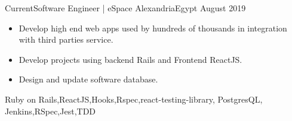 \begin{experiences}
  \experience
    {Current}{Software Engineer | eSpace }{Alexandria}{Egypt}
    {August 2019}   {
                      \begin{itemize}
                        \item Develop high end web apps used by hundreds of thousands in integration with third parties service.
                        \item Develop projects using backend Rails and Frontend ReactJS.
                        \item Design and update software database.
                      \end{itemize}
                    }
                    {Ruby on Rails,ReactJS,Hooks,Rspec,react-testing-library, PostgresQL, Jenkins,RSpec,Jest,TDD}                    
\end{experiences}
